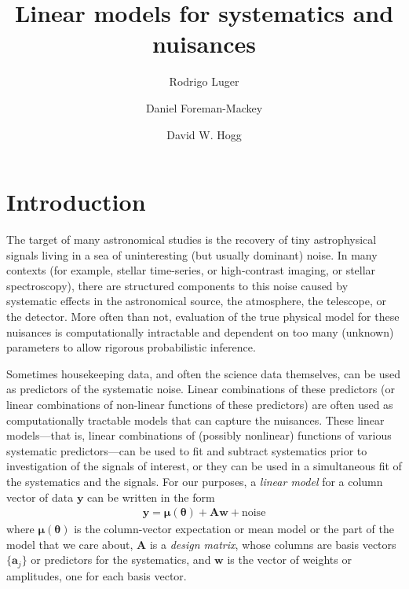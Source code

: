 \documentclass[modern]{rnaastex}
\newcommand{\eqlabel}[1]{\label{eq:#1}}
\newcommand{\bvec}[1]{{\ensuremath{\boldsymbol{#1}}}}
\newcommand{\mA}{\ensuremath{\bvec{A}}}
\newcommand{\vw}{\ensuremath{\bvec{w}}}
\newcommand{\vy}{\ensuremath{\bvec{y}}}
\newcommand{\vm}{\ensuremath{\bvec{\mu}(\bvec{\theta})}}
\begin{document}
\raggedbottom\sloppy\sloppypar\frenchspacing

\title{%
    Linear models for systematics and nuisances
}

\author[0000-0002-0296-3826]{Rodrigo Luger}

\author[0000-0002-9328-5652]{Daniel Foreman-Mackey}

\author[0000-0003-2866-9403]{David W. Hogg}


\section{Introduction}

The target of many astronomical studies is the recovery of tiny astrophysical
signals living in a sea of uninteresting (but usually dominant) noise.
In many contexts (for example, stellar time-series, or
high-contrast imaging, or stellar spectroscopy), there are structured
components to this noise caused by systematic
effects in the astronomical source, the atmosphere, the telescope, or
the detector.
More often than not, evaluation of the true physical model for these nuisances
is computationally intractable and dependent on too many (unknown) parameters
to allow rigorous probabilistic inference.

Sometimes housekeeping data, and often the science data themselves,
can be used as predictors of the systematic noise.
Linear combinations of these predictors (or linear combinations of non-linear functions
of these predictors) are often used as
computationally tractable models that can capture the nuisances.
These linear models---that is, linear combinations of (possibly nonlinear) functions
of various systematic predictors---can be used to fit and subtract systematics prior to
investigation of the signals of interest, or they can be used in a
simultaneous fit of the systematics and the signals.
For our purposes, a \emph{linear model} for a column vector of data $\vy$
can be written in the form
\begin{align}
\eqlabel{linearmodel}
\bvec{y} = \vm + \mA \vw + \mathrm{noise}
\end{align}
where $\vm$ is the column-vector expectation or mean model or the part of the model
that we care about, $\mA$ is a \emph{design matrix}, whose columns are basis
vectors $\{\bvec{a}_j\}$ or predictors for the systematics,
and $\vw$ is the vector of weights or amplitudes, one
for each basis vector.
\end{document}
